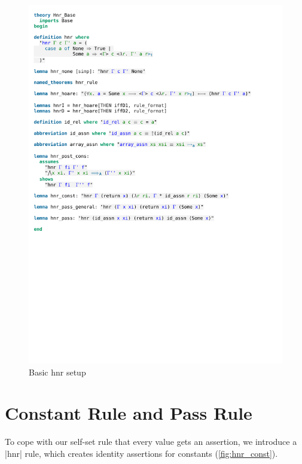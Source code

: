 \begin{figure}[htpb]
    \includegraphics[trim={0 14,6cm 0 6,2cm}, clip, width=1.00\textwidth]{figures/Theory_Hnr_Base.pdf}
    \caption[Basic hnr setup]{Basic hnr setup}
    \label{fig:hnr_base}
\end{figure}

\section{Constant Rule and Pass Rule}\label{section:hnr_const_pass}

To cope with our self-set rule that every value gets an assertion, we introduce a |hnr| rule, which creates identity assertions for constants (\autoref{fig:hnr_const}).

